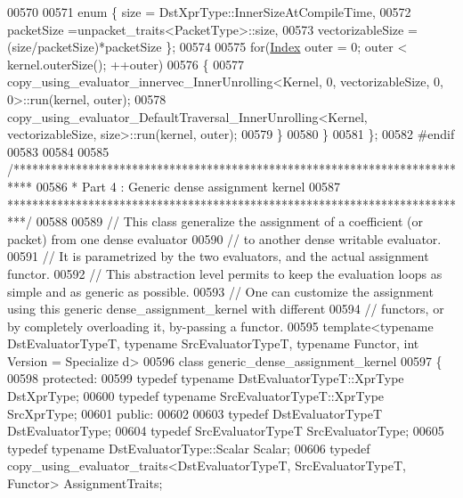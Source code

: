 \begin{DoxyCode}
00570 
00571     \textcolor{keyword}{enum} \{ size = DstXprType::InnerSizeAtCompileTime,
00572            packetSize =unpacket\_traits<PacketType>::size,
00573            vectorizableSize = (size/packetSize)*packetSize \};
00574 
00575     \textcolor{keywordflow}{for}(\hyperlink{namespace_eigen_a62e77e0933482dafde8fe197d9a2cfde}{Index} outer = 0; outer < kernel.outerSize(); ++outer)
00576     \{
00577       copy\_using\_evaluator\_innervec\_InnerUnrolling<Kernel, 0, vectorizableSize, 0, 0>::run(kernel, outer);
00578       copy\_using\_evaluator\_DefaultTraversal\_InnerUnrolling<Kernel, vectorizableSize, size>::run(kernel, 
      outer);
00579     \}
00580   \}
00581 \};
00582 \textcolor{preprocessor}{#endif}
00583 
00584 
00585 \textcolor{comment}{/***************************************************************************}
00586 \textcolor{comment}{* Part 4 : Generic dense assignment kernel}
00587 \textcolor{comment}{***************************************************************************/}
00588 
00589 \textcolor{comment}{// This class generalize the assignment of a coefficient (or packet) from one dense evaluator}
00590 \textcolor{comment}{// to another dense writable evaluator.}
00591 \textcolor{comment}{// It is parametrized by the two evaluators, and the actual assignment functor.}
00592 \textcolor{comment}{// This abstraction level permits to keep the evaluation loops as simple and as generic as possible.}
00593 \textcolor{comment}{// One can customize the assignment using this generic dense\_assignment\_kernel with different}
00594 \textcolor{comment}{// functors, or by completely overloading it, by-passing a functor.}
00595 \textcolor{keyword}{template}<\textcolor{keyword}{typename} DstEvaluatorTypeT, \textcolor{keyword}{typename} SrcEvaluatorTypeT, \textcolor{keyword}{typename} Functor, \textcolor{keywordtype}{int} Version = Specialize
      d>
00596 \textcolor{keyword}{class }generic\_dense\_assignment\_kernel
00597 \{
00598 \textcolor{keyword}{protected}:
00599   \textcolor{keyword}{typedef} \textcolor{keyword}{typename} DstEvaluatorTypeT::XprType DstXprType;
00600   \textcolor{keyword}{typedef} \textcolor{keyword}{typename} SrcEvaluatorTypeT::XprType SrcXprType;
00601 \textcolor{keyword}{public}:
00602   
00603   \textcolor{keyword}{typedef} DstEvaluatorTypeT DstEvaluatorType;
00604   \textcolor{keyword}{typedef} SrcEvaluatorTypeT SrcEvaluatorType;
00605   \textcolor{keyword}{typedef} \textcolor{keyword}{typename} DstEvaluatorType::Scalar Scalar;
00606   \textcolor{keyword}{typedef} copy\_using\_evaluator\_traits<DstEvaluatorTypeT, SrcEvaluatorTypeT, Functor> AssignmentTraits;

\end{DoxyCode}
